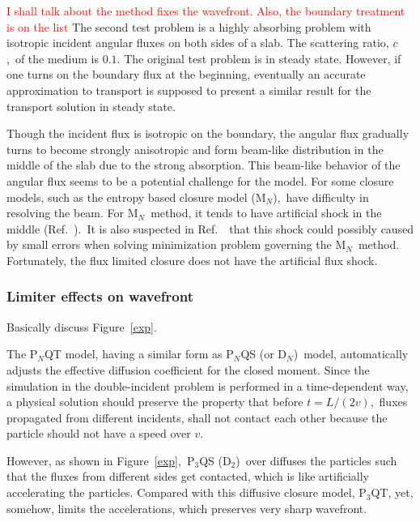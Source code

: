 \documentclass[review]{elsarticle}
\begin{document}
\textcolor{red}{I shall talk about the method fixes the wavefront. Also, the boundary treatment is on the list}
The second test problem is a highly absorbing problem with isotropic incident angular fluxes on both sides of a slab. The scattering ratio, $c$,~of the medium is $0.1$. The original test problem is in steady state. However, if one turns on the boundary flux at the beginning, eventually an accurate approximation to transport is supposed to present a similar result for the transport solution in steady state.

Though the incident flux is isotropic on the boundary, the angular flux gradually turns to become strongly anisotropic and form beam-like distribution in the middle of the slab due to the strong absorption. This beam-like behavior of the angular flux seems to be a potential challenge for the model. For some closure models, such as the entropy based closure model (M$_N$),~have difficulty in resolving the beam. For M$_N$~method, it tends to have artificial shock in the middle (Ref.~\cite{brunnerentropy,coryentropy}).~It is also suspected in Ref.~\cite{coryentropy}~that this shock could possibly caused by small errors when solving minimization problem governing the M$_N$~method. Fortunately, the flux limited closure does not have the artificial flux shock.
\subsubsection*{Limiter effects on wavefront}
Basically discuss Figure~\ref{exp}.

The P$_N$QT model, having a similar form as P$_N$QS (or D$_N$)~model, automatically adjusts the effective diffusion coefficient for the closed moment. Since the simulation in the double-incident problem is performed in a time-dependent way, a physical solution should preserve the property that before $t=L/(2v)$,~fluxes propagated from different incidents, shall not contact each other because the particle should not have a speed over $v$.

However, as shown in Figure~\ref{exp},~P$_3$QS (D$_2$)~over diffuses the particles such that the fluxes from different sides get contacted, which is like artificially accelerating the particles. Compared with this diffusive closure model, P$_3$QT, yet, somehow, limits the accelerations, which preserves very sharp wavefront.
\end{document}
